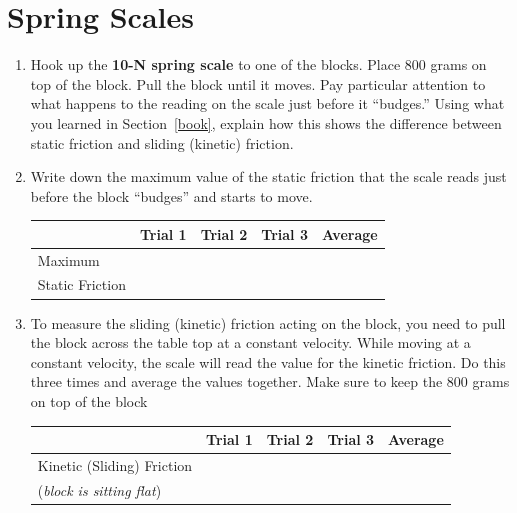 \documentclass[10pt]{exam}
\begin{document}
  

\pagebreak
\section{Spring Scales} \label{scales}

\begin{enumerate}
  \item 
    Hook up the \textbf{10-N spring scale} to one of the blocks. Place 800 grams on top of the block.  Pull the block until it moves.  Pay particular attention to what happens to the reading on the scale just before it ``budges.''  Using what you learned in Section~\ref{book}, explain how this shows the difference between static friction and sliding (kinetic) friction.
    \vs

  \item Write down the maximum value of the static friction that the scale reads just before the block ``budges'' and starts to move.

    \begin{tabular}{|p{12em}
      *3{|>{\centering\arraybackslash}m{.1\textwidth}}
      ||>{\centering\arraybackslash}m{.1\textwidth}|}
      \hline
      & Trial 1 & Trial 2 & Trial 3 & Average \\\hline
        Maximum &&&& \\
        Static Friction &&&& \\\hline
    \end{tabular}
    
  \item \label{measure-sliding}
    To measure the sliding (kinetic) friction acting on the block, you need to pull the block across the table top at a constant velocity. While moving at a constant velocity, the scale will read the value for the kinetic friction.  Do this three times and average the values together.  Make sure to keep the 800 grams on top of the block

    \begin{tabular}{|p{12em}
      *3{|>{\centering\arraybackslash}m{.1\textwidth}}
      ||>{\centering\arraybackslash}m{.1\textwidth}|}
      \hline
      & Trial 1 & Trial 2 & Trial 3 & Average \\\hline
        Kinetic (Sliding) Friction &&&& \\
        (\emph{block is sitting flat}) &&&& \\\hline
    \end{tabular}



\end{enumerate}
\end{document}
